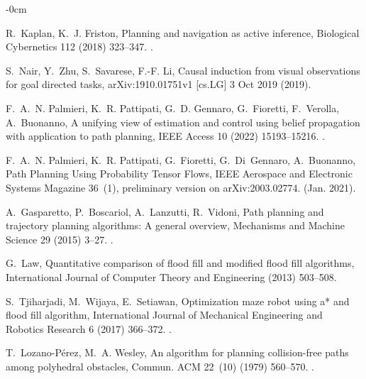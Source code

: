 \documentclass[journal,article,submit,pdftex,moreauthors]{Definitions/mdpi}
\begin{document}
\begin{adjustwidth}{-\extralength}{0cm}
\begin{thebibliography}{10}
	R.~Kaplan, K.~J. Friston, Planning and navigation as active inference,
	  Biological Cybernetics 112 (2018) 323--347.
	\newblock \href {https://doi.org/10.1007/s00422-018-0753-2}
	  {}.
	
	S.~Nair, Y.~Zhu, S.~Savarese, F.-F. Li, Causal induction from visual
	  observations for goal directed tasks, arXiv:1910.01751v1 [cs.LG] 3 Oct 2019
	  (2019).
	
	F.~A.~N. Palmieri, K.~R. Pattipati, G.~D. Gennaro, G.~Fioretti, F.~Verolla,
	  A.~Buonanno, A unifying view of estimation and control using belief
	  propagation with application to path planning, IEEE Access 10 (2022)
	  15193--15216.
	\newblock \href {https://doi.org/10.1109/ACCESS.2022.3148127}
	  {}.
	
	F.~A.~N. Palmieri, K.~R. Pattipati, G.~Fioretti, G.~Di~Gennaro, A.~Buonanno,
	  {Path Planning Using Probability Tensor Flows}, IEEE Aerospace and Electronic
	  Systems Magazine 36~(1), preliminary version on arXiv:2003.02774. (Jan.
	  2021).
	
	A.~Gasparetto, P.~Boscariol, A.~Lanzutti, R.~Vidoni, Path planning and
	  trajectory planning algorithms: A general overview, Mechanisms and Machine
	  Science 29 (2015) 3--27.
	\newblock \href {https://doi.org/10.1007/978-3-319-14705-5\_1}
	  {}.
	
	G.~Law, Quantitative comparison of flood fill and modified flood fill
	  algorithms, International Journal of Computer Theory and Engineering (2013)
	  503--508\href {https://doi.org/10.7763/IJCTE.2013.V5.738}
	  {}.
	
	S.~Tjiharjadi, M.~Wijaya, E.~Setiawan, Optimization maze robot using a* and
	  flood fill algorithm, International Journal of Mechanical Engineering and
	  Robotics Research 6 (2017) 366--372.
	\newblock \href {https://doi.org/10.18178/ijmerr.6.5.366-372}
	  {}.
	
	T.~Lozano-P\'{e}rez, M.~A. Wesley, An algorithm for planning collision-free
	  paths among polyhedral obstacles, Commun. ACM 22~(10) (1979) 560–570.
	\newblock \href {https://doi.org/10.1145/359156.359164}
	  {}.
	

\end{thebibliography}
\end{adjustwidth}
\end{document}
